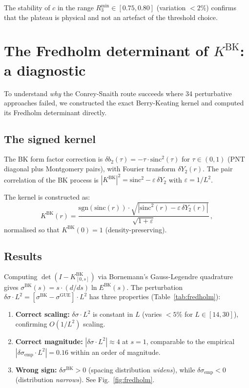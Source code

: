 \documentclass[11pt]{article}
\begin{document}
The stability of $c$ in the range $R_3^{\min} \in [0.75, 0.80]$ (variation
$< 2\%$) confirms that the plateau is physical and not an artefact of the
threshold choice.


\section{The Fredholm determinant of $K^{\mathrm{BK}}$: a diagnostic}
\label{sec:fredholm}

To understand \emph{why} the Conrey-Snaith route succeeds where 34 perturbative
approaches failed, we constructed the exact Berry-Keating kernel and computed
its Fredholm determinant directly.

\subsection{The signed kernel}

The BK form factor correction is $\delta b_2(\tau) = -\tau \cdot \mathrm{sinc}^2(\tau)$
for $\tau \in (0,1)$ (PNT diagonal plus Montgomery pairs), with Fourier
transform $\delta Y_2(r)$. The pair correlation of the BK process is
$|K^{\mathrm{BK}}|^2 = \mathrm{sinc}^2 - \varepsilon\,\delta Y_2$
with $\varepsilon = 1/L^2$.

The kernel is constructed as:
\begin{equation}
K^{\mathrm{BK}}(r) = \frac{\mathrm{sgn}(\mathrm{sinc}(r)) \cdot
\sqrt{|\mathrm{sinc}^2(r) - \varepsilon\,\delta Y_2(r)|}}
{\sqrt{1 + \varepsilon}}\,,
\label{eq:KBK}
\end{equation}
normalised so that $K^{\mathrm{BK}}(0) = 1$ (density-preserving).

\subsection{Results}

Computing $\det(I - K^{\mathrm{BK}}_{[0,s]})$ via Bornemann's Gauss-Legendre
quadrature~\cite{bornemann2010} gives $\sigma^{\mathrm{BK}}(s) = s \cdot
(d/ds) \ln E^{\mathrm{BK}}(s)$. The perturbation
$\delta\sigma \cdot L^2 = [\sigma^{\mathrm{BK}} - \sigma^{\mathrm{GUE}}] \cdot L^2$
has three properties (Table~\ref{tab:fredholm}):

\begin{enumerate}
\item \textbf{Correct scaling:} $\delta\sigma \cdot L^2$ is constant in $L$
(varies $< 5\%$ for $L \in [14, 30]$), confirming $O(1/L^2)$ scaling.
\item \textbf{Correct magnitude:} $|\delta\sigma \cdot L^2| \approx 4$ at $s = 1$,
comparable to the empirical $|\delta\sigma_{\mathrm{emp}} \cdot L^2| = 0.16$
within an order of magnitude.
\item \textbf{Wrong sign:} $\delta\sigma^{\mathrm{BK}} > 0$ (spacing distribution
\emph{widens}), while $\delta\sigma_{\mathrm{emp}} < 0$ (distribution
\emph{narrows}). See Fig.~\ref{fig:fredholm}.
\end{enumerate}
\end{document}
